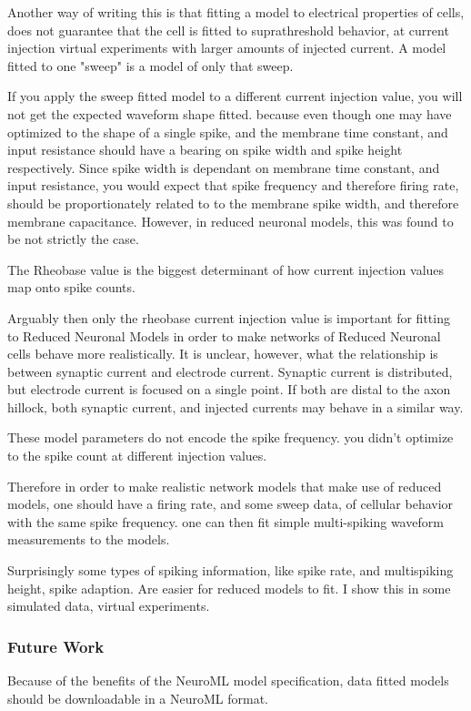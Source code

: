 Another way of writing this is that fitting a model to electrical properties of cells, does not
guarantee that the cell is fitted to suprathreshold behavior, at current injection virtual experiments with larger amounts of injected current.
A model fitted to one "sweep" is a model of only that sweep. 

If you apply the sweep fitted model to a different current injection value, you will not get the expected waveform shape fitted.
because even though one may have optimized to the shape of a single spike, and the membrane time constant, and input resistance should have a bearing
 on spike width and spike height respectively. Since spike width is dependant on membrane time constant, and input resistance, you 
 would expect that spike frequency and therefore firing rate, should be proportionately related to 
 to the membrane spike width, and therefore membrane capacitance. However, in reduced neuronal models, this was found
 to be not strictly the case.

 The Rheobase value is the biggest determinant of how current injection values map onto spike counts.


 Arguably then only the rheobase current injection value is important for fitting to Reduced Neuronal Models in order to make networks of Reduced Neuronal cells behave more realistically.
 It is unclear, however, what the relationship is between synaptic current and electrode current. Synaptic current is distributed, but electrode current is focused on a single point.
 If both are distal to the axon hillock, both synaptic current, and injected currents may behave in a similar way.


 These model parameters do not encode the spike frequency.
you didn't optimize to the spike count at different injection values.

Therefore in order to make realistic network models that make use of reduced models, 
one should have a firing rate, and some sweep data, of cellular behavior with the same spike frequency.
one can then fit simple multi-spiking waveform measurements to the models.

Surprisingly some types of spiking information, like spike rate, and multispiking height, spike adaption.
Are easier for reduced models to fit. I show this in some simulated data, virtual experiments.


\subsubsection{Future Work}
Because of the benefits of the NeuroML model specification, data fitted models should be downloadable in a NeuroML format.